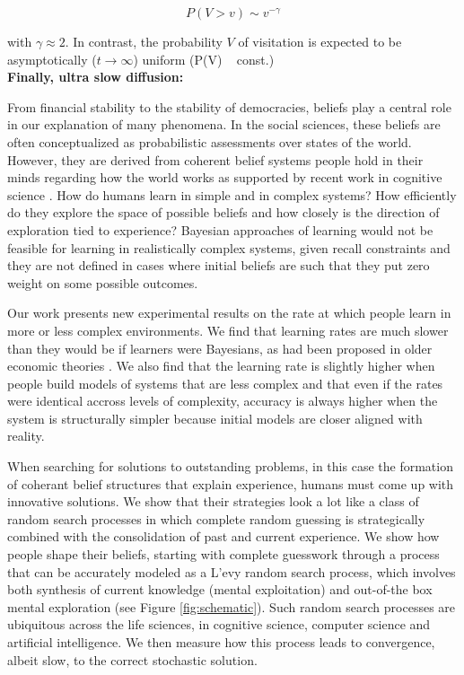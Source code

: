 \begin{equation}
P(V > v) \sim v^{-\gamma}
\end{equation}

with $\gamma \approx 2$. In contrast, the probability $V$ of visitation is expected to be asymptotically ($t \rightarrow \infty$) uniform (P(V) ~ const.)\\

{\bf Finally, ultra slow diffusion: }



\clearpage


From financial stability to the stability of democracies, beliefs play a central role in our explanation of many phenomena. In the social sciences, these beliefs are often conceptualized as probabilistic assessments over states of the world.  However, they are derived from coherent belief systems people hold in their minds regarding how the world works as supported by recent work in cognitive science \cite{lombrozo2006structure, anderson1990cognitive}.  How do humans learn in simple and in complex systems?  How efficiently do they explore the space of possible beliefs and how closely is the direction of exploration tied to experience?  Bayesian approaches of learning would not be feasible for learning in realistically complex systems, given recall constraints and they are not defined in cases where initial beliefs are such that they put zero weight on some possible outcomes.

Our work presents new experimental results on the rate at which people learn in more or less complex environments. We find that learning rates are much slower than they would be if learners were Bayesians, as had been proposed in older economic theories \cite{Boyer84, Prescott72, Rothschild74, McLennan84, Mirman84, Easley89, Kiefer89}. We also find that the learning rate is slightly higher when people build models of systems that are less complex and that even if the rates were identical accross levels of complexity, accuracy is always higher when the system is structurally simpler because initial models are closer aligned with reality.

When searching for solutions to outstanding problems, in this case the formation of coherant belief structures that explain experience, humans must come up with innovative solutions.  We show that their strategies look a lot like a class of random search processes in which complete random guessing is strategically combined with the consolidation of past and current experience. We show how people shape their beliefs, starting with complete guesswork through a process that can be accurately modeled as a L'evy random search process, which involves both synthesis of current knowledge (mental exploitation) and out-of-the box mental exploration (see Figure \ref{fig:schematic}). Such random search processes are ubiquitous across the life sciences, in cognitive science, computer science  and artificial intelligence. We then measure how this process leads to convergence, albeit slow, to the correct stochastic solution.

